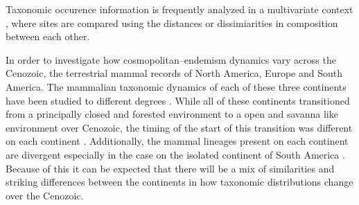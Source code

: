\documentclass[12pt,letterpaper]{article}
\begin{document}
Taxonomic occurence information is frequently analyzed in a multivariate context \citep{Legendre2012}, where sites are compared using the distances or dissimiarities in composition between each other. 



In order to investigate how cosmopolitan--endemism dynamics vary across the Cenozoic, the terrestrial mammal records of North America, Europe and South America. The mammalian taxonomic dynamics of each of these three continents have been studied to different degrees \citep{Jernvall2002,Jernvall2004,Flynn1998a,Macfadden2006,Macfadden1997,Alroy1996a,Blois2009,Eronen2009,Gunnell1995,Raia2006}. While all of these continents transitioned from a principally closed and forested environment to a open and savanna like environment over Cenozoic, the timing of the start of this transition was different on each continent \citep{Blois2009,Eronen2009,Janis1993b}. Additionally, the mammal lineages present on each continent are divergent especially in the case on the isolated continent of South America \citep{Flynn1998a,Macfadden2006,Macfadden1997}. Because of this it can be expected that there will be a mix of similarities and striking differences between the continents in how taxonomic distributions change over the Cenozoic.
\end{document}
